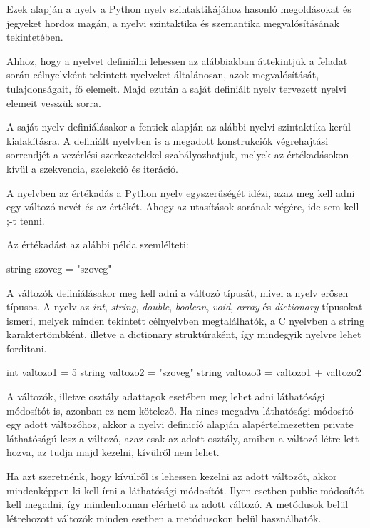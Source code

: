 Ezek alapján a nyelv a Python nyelv szintaktikájához hasonló megoldásokat és jegyeket hordoz magán, a nyelvi szintaktika és szemantika megvalósításának tekintetében.

Ahhoz, hogy a nyelvet definiálni lehessen az alábbiakban áttekintjük a feladat során célnyelvként tekintett nyelveket általánosan, azok megvalósítását, tulajdonságait, fő elemeit. Majd ezután a saját definiált nyelv tervezett nyelvi elemeit vesszük sorra.


A saját nyelv definiálásakor a fentiek alapján az alábbi nyelvi szintaktika kerül kialakításra.
A definiált nyelvben is a megadott konstrukciók végrehajtási sorrendjét a vezérlési szerkezetekkel szabályozhatjuk, melyek az értékadásokon kívül a szekvencia, szelekció és iteráció.

A nyelvben az értékadás a Python nyelv egyszerűségét idézi, azaz meg kell adni egy változó nevét és az értékét. Ahogy az utasítások sorának végére, ide sem kell ;-t tenni.

Az értékadást az alábbi példa szemlélteti:
\begin{cpp}
string szoveg = "szoveg"
\end{cpp}

A változók definiálásakor meg kell adni a változó típusát, mivel a nyelv erősen típusos. A nyelv az \textit{int}, \textit{string}, \textit{double}, \textit{boolean}, \textit{void}, \textit{array} és \textit{dictionary} típusokat ismeri, melyek minden tekintett célnyelvben megtalálhatók, a C nyelvben a string karaktertömbként, illetve a dictionary struktúraként, így mindegyik nyelvre lehet fordítani.
\begin{cpp}
int valtozo1 = 5
string valtozo2 = "szoveg"
string valtozo3 = valtozo1 + valtozo2
\end{cpp}


A változók, illetve osztály adattagok esetében meg lehet adni láthatósági módosítót is, azonban ez nem kötelező. Ha nincs megadva láthatósági módosító egy adott változóhoz, akkor a nyelvi definicíó alapján alapértelmezetten private láthatóságú lesz a változó, azaz csak az adott osztály, amiben a változó létre lett hozva, az tudja majd kezelni, kívülről nem lehet.

Ha azt szeretnénk, hogy kívülről is lehessen kezelni az adott változót, akkor mindenképpen ki kell írni a láthatósági módosítót. Ilyen esetben public módosítót kell megadni, így mindenhonnan elérhető az adott változó. A metódusok belül létrehozott változók minden esetben a metódusokon belül használhatók.

